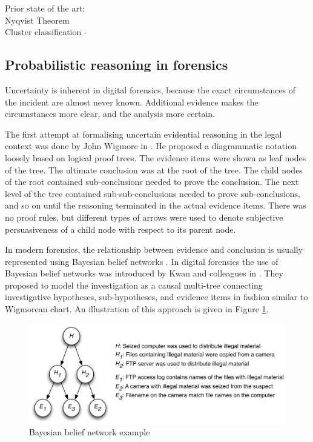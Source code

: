 \documentclass[10pt,a4paper]{article}
\begin{document}
Prior state of the art:\\
	Nyqvist Theorem \cite{Nyquist1928}\\
	Cluster classification - \cite{li2011novel}\\

\subsection{Probabilistic reasoning in forensics}

Uncertainty is inherent in digital forensics, because the exact circumstances of the incident are almost never known.  Additional evidence makes the circumstances more clear, and the analysis more certain.  

The first attempt at formalising uncertain evidential reasoning in the legal context was done by John Wigmore in \cite{wigmore1923treatise}. He proposed a diagrammatic notation loosely based on logical proof trees. The evidence items were shown as leaf nodes of the tree. The ultimate conclusion was at the root of the tree. The child nodes of the root contained sub-conclusions needed to prove the conclusion. The next level of the tree contained sub-sub-conclusions needed to prove sub-conclusions, and so on until the reasoning terminated in the actual evidence items. There was no proof rules, but different types of arrows were used to denote subjective persuasiveness of a child node with respect to its parent node.

In modern forensics, the relationship between evidence and conclusion is usually represented using Bayesian belief networks \cite{taroni2010data}. In digital forensics the use of Bayesian belief networks was introduced by Kwan and colleagues in \cite{kwan2008reasoning}. They proposed to model the investigation as a causal multi-tree connecting investigative hypotheses, sub-hypotheses, and evidence items in fashion similar to Wigmorean chart. An illustration of this approach is given in Figure \ref{fig:bayesnet}. 

\begin{figure}[h]
\centering
\includegraphics[width=\textwidth]{fig-1.pdf}
\caption{Bayesian belief network example}
\label{fig:bayesnet}
\end{figure}
 
\end{document}
